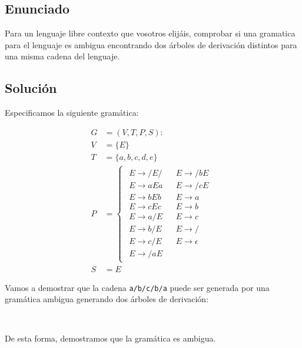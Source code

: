 \chapter{}

\section{Enunciado}

Para un lenguaje libre contexto que vosotros elijáis, comprobar si una gramatica para el lenguaje es ambigua encontrando dos árboles de derivación distintos para una misma cadena del lenguaje.

\section{Solución}

Especificamos la siguiente gramática:

\begin{align*}
	G &= (V, T, P, S) : \\
	V &= \{E\} \\
	T &= \{a, b, c, d, e\} \\
	P &=
		\begin{cases}
		\begin{array}{lll}
			E \rightarrow /E/ &  & E \rightarrow /bE      \\
			E \rightarrow aEa &  & E \rightarrow /cE      \\
			E \rightarrow bEb &  & E \rightarrow a        \\
			E \rightarrow cEc &  & E \rightarrow b        \\
			E \rightarrow a/E &  & E \rightarrow c        \\
			E \rightarrow b/E &  & E \rightarrow /        \\
			E \rightarrow c/E &  & E \rightarrow \epsilon \\
			E \rightarrow /aE &  &
		\end{array}
 		\end{cases} \\
	S &= E
\end{align*}

Vamos a demostrar que la cadena \texttt{a/b/c/b/a} puede ser generada por una gramática ambigua generando dos árboles de derivación:

\begin{center}
\ \ \ \ \ \ \ \ \ \ \ \ \ \ \ \
\end{center}

De esta forma, demostramos que la gramática es ambigua.
